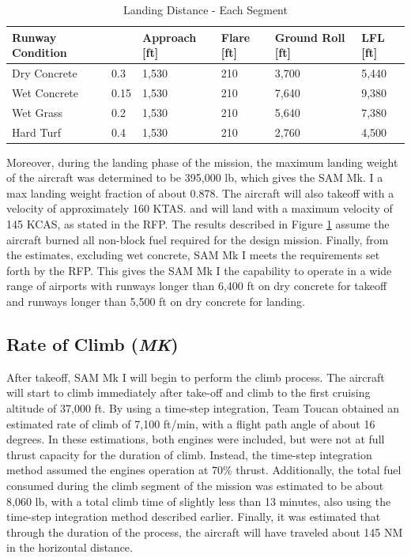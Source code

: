 \begin{table}[!h]
    \centering
    \caption{Landing Distance - Each Segment}
    \begin{tabular}{|p{1.1in}|p{.3in}|p{.8in}|p{.6in}|p{1.0in}|p{.55in}|}\toprule 
    \textbf{Runway Condition} & \boldmath{$\mu$} \textbf{\cite{raymer}} & \textbf{Approach [ft]} & \textbf{Flare [ft]} & \textbf{Ground Roll [ft]} & \textbf{LFL [ft]} \\ \hline \hline
    Dry Concrete & 0.3 & 1,530 & 210 & 3,700 & 5,440  \\ \hline
    Wet Concrete & 0.15 & 1,530 & 210 & 7,640 & 9,380\\ \hline
    Wet Grass & 0.2 & 1,530 & 210 & 5,640 & 7,380\\ \hline
    Hard Turf & 0.4 & 1,530 & 210 & 2,760 & 4,500\\ \bottomrule
    \end{tabular}
    \label{tab:land}
\end{table}

Moreover, during the landing phase of the mission, the maximum landing weight of the aircraft was determined to be 395,000 lb, which gives the SAM Mk. I a max landing weight fraction of about 0.878. The aircraft will also takeoff with a velocity of approximately 160 KTAS. and will land with a maximum velocity of 145 KCAS, as stated in the RFP. The results described in Figure \ref{tab:land} assume the aircraft burned all non-block fuel required for the design mission. Finally, from the estimates, excluding wet concrete, SAM Mk I meets the requirements set forth by the RFP. This gives the SAM Mk I the capability to operate in a wide range of airports with runways longer than 6,400 ft on dry concrete for takeoff and runways longer than 5,500 ft on dry concrete for landing.

\subsection{Rate of Climb (\textit{MK})}
After takeoff, SAM Mk I will begin to perform the climb process. The aircraft will start to climb immediately after take-off and climb to the first cruising altitude of 37,000 ft. By using a time-step integration, Team Toucan obtained an estimated rate of climb of 7,100 ft/min, with a flight path angle of about 16 degrees. In these estimations, both engines were included, but were not at full thrust capacity for the duration of climb. Instead, the time-step integration method assumed the engines operation at 70\% thrust. Additionally, the total fuel consumed during the climb segment of the mission was estimated to be about 8,060 lb, with a total climb time of slightly less than 13 minutes, also using the time-step integration method described earlier. Finally, it was estimated that through the duration of the process, the aircraft will have traveled about 145 NM in the horizontal distance.

